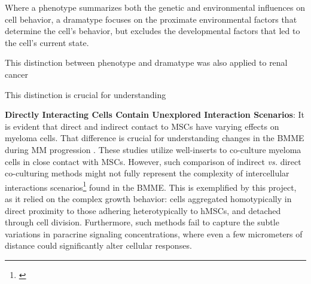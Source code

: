 Where a phenotype summarizes both the genetic and environmental influences on
cell behavior, a dramatype focuses on the proximate environmental factors that
determine the cell's behavior, but excludes the developmental factors that led
to the cell's current state.

This distinction between phenotype and dramatype was also applied to renal cancer\cite{hinoStudiesFamilialTumors2004}

This distinction is crucial for understanding

\newcommand{\footcadddramatype}{%
      \emph{CADD dramatype} (defined in this work): Specific \ac{CADD}
      characteristics determined by proximate environmental factors. This
      includes the time cells spend in an adhesive state \dashed{attached,
            migrating, or detached} or cell interaction scenario
      \footref{foot:interactionscenario} \dashed{homotypic, heterotypic, or
            substrate} and the cause of transitions between these states and
      scenarios. The CADD dramatype can be associated with molecular signatures,
      such as \ac{CAM} expression phenotype or signal transduction mediated by
      proximate environmental factors. It allows clear separation
      of developmental and proximate environments
      the term \emph{phenotype} \dashed{defining
            the } with
      processes on the protein level, such as conformational changes
      of integrins
}

\textbf{Directly Interacting Cells Contain Unexplored Interaction Scenarios}: It
is evident that direct and indirect contact to \acp{MSC} have varying effects on
myeloma cells. That difference is crucial for understanding changes in the
\ac{BMME} during MM progression \cite{fairfieldMultipleMyelomaCells2020,
      dziadowiczBoneMarrowStromaInduced2022}. These studies utilize well-inserts to
co-culture myeloma cells in close  contact with MSCs. However,
such comparison of indirect \textit{vs.} direct co-culturing methods might not
fully represent the complexity of intercellular interactions
scenarios\footnote{\footinteractionscenario\label{foot:interactionscenario}}
found in the \ac{BMME}. This is exemplified by this project, as it relied on the
complex growth behavior: \INA cells aggregated homotypically in direct proximity
to those adhering heterotypically to \acp{hMSC}, and detached through cell
division. Furthermore, such methods fail to capture the subtle variations in
paracrine signaling concentrations, where even a few micrometers of distance
could significantly alter cellular responses.

